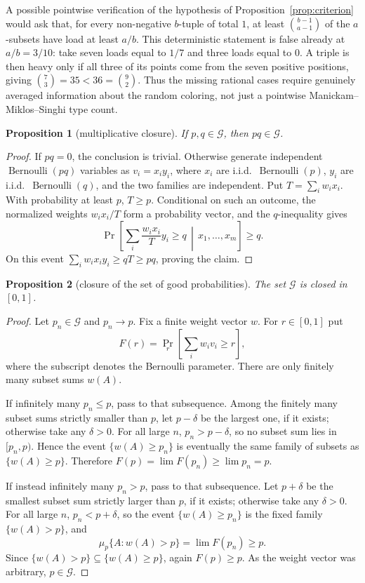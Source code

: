 \documentclass[12pt]{article}
\newtheorem{proposition}{Proposition}
\newcommand{\Ber}{\operatorname{Bernoulli}}
\begin{document}
A possible pointwise verification of the hypothesis of
Proposition~\ref{prop:criterion} would ask that, for every non-negative
\(b\)-tuple of total \(1\), at least \(\binom{b-1}{a-1}\) of the
\(a\)-subsets have load at least \(a/b\).  This deterministic statement is
false already at \(a/b=3/10\): take seven
loads equal to \(1/7\) and three loads equal to \(0\).  A triple is then heavy
only if all three of its points come from the seven positive positions, giving
\(\binom73=35<36=\binom92\).  Thus the missing rational cases require genuinely
averaged information about the random coloring, not just a pointwise
Manickam--Miklos--Singhi type count.

\begin{proposition}[multiplicative closure]\label{prop:closure}
If \(p,q\in\mathcal G\), then \(pq\in\mathcal G\).
\end{proposition}

\begin{proof}
If \(pq=0\), the conclusion is trivial.  Otherwise generate independent
\(\Ber(pq)\) variables as \(v_i=x_i y_i\), where
\(x_i\) are i.i.d.\ \(\Ber(p)\), \(y_i\) are i.i.d.\ \(\Ber(q)\), and the two
families are independent.  Put \(T=\sum_i w_i x_i\).  With probability at least
\(p\), \(T\ge p\).  Conditional on such an outcome, the normalized weights
\(w_i x_i/T\) form a probability vector, and the \(q\)-inequality gives
\[
 \Pr\!\left[\sum_i \frac{w_i x_i}{T}y_i\ge q\,\middle|\,x_1,\ldots,x_m\right]
 \ge q .
\]
On this event \(\sum_i w_i x_i y_i\ge qT\ge pq\), proving the claim.
\end{proof}

\begin{proposition}[closure of the set of good probabilities]\label{prop:closed}
The set \(\mathcal G\) is closed in \([0,1]\).
\end{proposition}

\begin{proof}
Let \(p_n\in\mathcal G\) and \(p_n\to p\).  Fix a finite weight vector \(w\).
For \(r\in[0,1]\) put
\[
        F(r)=\Pr_r\!\left[\sum_i w_i v_i\ge r\right],
\]
where the subscript denotes the Bernoulli parameter.  There are only finitely
many subset sums \(w(A)\).

If infinitely many \(p_n\le p\), pass to that subsequence.  Among the finitely
many subset sums strictly smaller than \(p\), let \(p-\delta\) be the largest
one, if it exists; otherwise take any \(\delta>0\).  For all large \(n\),
\(p_n>p-\delta\), so no subset sum lies in \([p_n,p)\).  Hence the
event \(\{w(A)\ge p_n\}\) is eventually the same family of subsets as
\(\{w(A)\ge p\}\).  Therefore \(F(p)=\lim F(p_n)\ge\lim p_n=p\).

If instead infinitely many \(p_n>p\), pass to that subsequence.  Let \(p+\delta\)
be the smallest subset sum strictly larger than \(p\), if it exists; otherwise
take any \(\delta>0\).  For all large \(n\), \(p_n<p+\delta\), so the event
\(\{w(A)\ge p_n\}\) is the fixed family \(\{w(A)>p\}\), and
\[
       \mu_p\{A:w(A)>p\}=\lim F(p_n)\ge p .
\]
Since \(\{w(A)>p\}\subseteq\{w(A)\ge p\}\), again \(F(p)\ge p\).  As the weight
vector was arbitrary, \(p\in\mathcal G\).
\end{proof}
\end{document}
